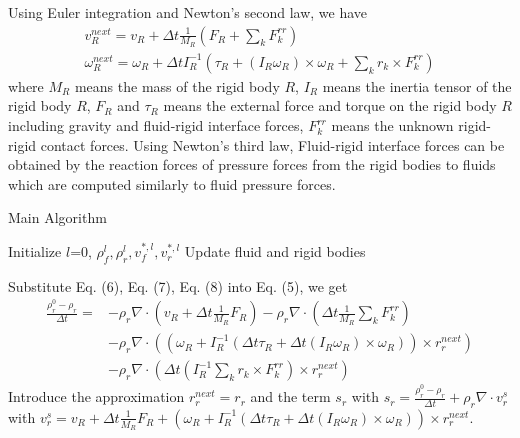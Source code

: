 \documentclass[acmlarge]{acmart}
\begin{document}
Using Euler integration and Newton's second law, we have
\begin{align}
  v_R^{next}=v_R+\Delta t\frac{1}{M_R}(F_R+\sum_k F_k^{rr})\\
  \omega_R^{next}=\omega_R+\Delta t I_R^{-1}(\tau_R+(I_R\omega_R)\times\omega_R+ \sum_k r_k\times F_k^{rr})
\end{align}
where $M_R$ means the mass of the rigid body $R$, $I_R$ means the inertia tensor of the rigid body $R$,
$F_R$ and $\tau_R$ means the external force and torque on the rigid body $R$ including gravity and 
fluid-rigid interface forces, $F_k^{rr}$ means the unknown rigid-rigid contact forces.
Using Newton's third law, Fluid-rigid interface forces can be 
obtained by the reaction forces of pressure forces from the rigid bodies to fluids
which are computed similarly to fluid pressure forces.


\begin{algorithm}[!h]
  \caption{Main Algorithm\label{MA}}
  Initialize $l$=0, $\rho_f^l,\rho_r^l,v_f^{*,l},v_r^{*,l} $ \;
  Update fluid and rigid bodies \;
\end{algorithm}

Substitute Eq. (6), Eq. (7), Eq. (8) into Eq. (5), we get
\begin{align*}
  \frac{\rho_r^0-\rho_r}{\Delta t}=
  &-\rho_r\nabla \cdot (v_R+\Delta t\frac{1}{M_R}F_R)-\rho_r\nabla \cdot (\Delta t\frac{1}{M_R}\sum_k F_k^{rr})\\
  &-\rho_r\nabla \cdot ((\omega_R+I_R^{-1}(\Delta t\tau_R+\Delta t(I_R\omega_R)\times\omega_R))\times r_r^{next})\\
  &-\rho_r\nabla \cdot (\Delta t (I_R^{-1}\sum_k r_k\times F_k^{rr})\times r_r^{next})
\end{align*}
Introduce the approximation $r_r^{next}=r_r$ and the term $s_r$ with $s_r=\frac{\rho_r^0-\rho_r}{\Delta t}+\rho_r\nabla\cdot v_r^s $
with $v_r^s=v_R+\Delta t\frac{1}{M_R}F_R+(\omega_R+I_R^{-1}(\Delta t\tau_R+\Delta t(I_R\omega_R)\times\omega_R))\times r_r^{next} $.
\end{document}
